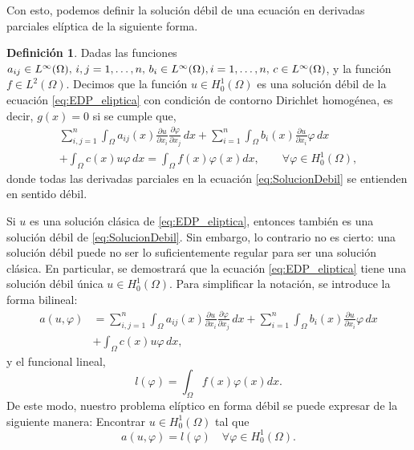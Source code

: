 \documentclass[a4paper,11pt,spanish, twoside, leqno]{tfg-uam}
\theoremstyle{definition}
\newtheorem{defin}[teor]{Definici\'on}
\begin{document}
Con esto, podemos definir la solución débil de una ecuación en derivadas parciales elíptica de la siguiente forma.
\begin{mdframed}
\begin{defin}\label{def:SolucionDebil}
    Dadas las funciones $a_{ij} \in L^\infty(\Omega), \, i,j = 1,\dots, n, \, b_i \in L^\infty(\Omega), \\i= 1, \dots, n, \, c\in L^\infty(\Omega)$, y la función $f\in L^2(\Omega)$. Decimos que la función $u\in H^1_0(\Omega)$ es una solución débil de la ecuación \eqref{eq:EDP_eliptica} con condición de contorno Dirichlet homogénea, es decir, $g(x)=0$ si se cumple que, 
    \begin{equation}\label{eq:SolucionDebil}
        \begin{aligned}
            \sum_{i,j=1}^{n} \int_\Omega a_{ij}(x) \frac{\partial u}{\partial x_i} \frac{\partial \varphi}{\partial x_j}\,dx + \sum_{i=1}^{n} \int_\Omega b_i(x)\frac{\partial u}{\partial x_i} \varphi \,dx  \\+ \int_\Omega c(x)u \varphi \,dx = \int_\Omega f(x)\varphi(x) dx, \qquad \forall \varphi \in H^1_0(\Omega),
        \end{aligned}
    \end{equation}
    donde todas las derivadas parciales en la ecuación \eqref{eq:SolucionDebil} se entienden en sentido débil.
\end{defin}
\end{mdframed}

Si $u $ es una solución clásica de \eqref{eq:EDP_eliptica}, entonces también es una solución débil de \eqref{eq:SolucionDebil}. Sin embargo, lo contrario no es cierto: una solución débil puede no ser lo suficientemente regular para ser una solución clásica. En particular, se demostrará que la ecuación \eqref{eq:EDP_eliptica} tiene una solución débil única $u \in H^1_0(\Omega) $. Para simplificar la notación, se introduce la forma bilineal:
\begin{equation}
    \begin{aligned}
        a(u,\varphi) &= \sum_{i,j=1}^{n} \int_\Omega a_{ij}(x) \frac{\partial u}{\partial x_i} \frac{\partial \varphi}{\partial x_j}\,dx + \sum_{i=1}^{n} \int_\Omega b_i(x)\frac{\partial u}{\partial x_i} \varphi \,dx  \\ &+ \int_\Omega c(x)u \varphi \,dx,
    \end{aligned}
\end{equation}
y el funcional lineal,
\begin{equation}
    l(\varphi) = \int_\Omega f(x)\varphi(x) dx.
\end{equation}
De este modo, nuestro problema elíptico en forma débil se puede expresar de la siguiente manera: Encontrar $u\in H^1_0(\Omega)$ tal que
\begin{equation}\label{eq:ProblemaDebilFormaBilineal}
    a(u,\varphi) = l(\varphi) \quad \forall \varphi\in H^1_0(\Omega).
\end{equation}
\end{document}
